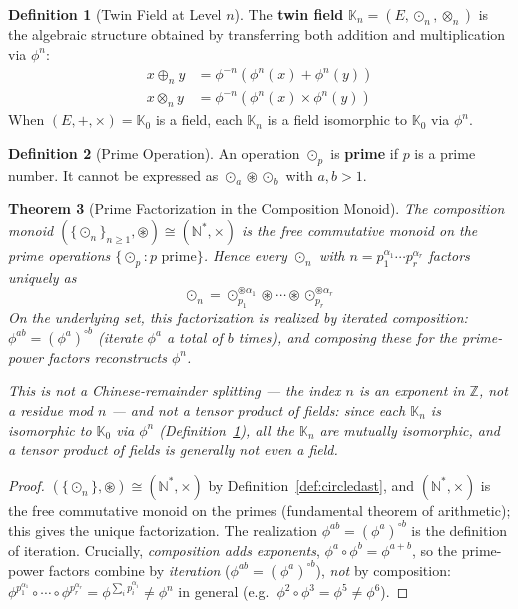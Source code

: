 \documentclass[11pt,twocolumn]{article}
\theoremstyle{plain}
\newtheorem{theorem}{Theorem}
\theoremstyle{definition}
\newtheorem{definition}[theorem]{Definition}
\theoremstyle{remark}
\newcommand{\N}{\mathbb{N}}
\newcommand{\Z}{\mathbb{Z}}
\newcommand{\Kk}{\mathbb{K}}
\begin{document}
\begin{definition}[Twin Field at Level $n$]\label{def:twin-field}
The \textbf{twin field} $\Kk_n = (E, \odot_n, \otimes_n)$ is the algebraic structure obtained by transferring both addition and multiplication via $\phi^n$:
\begin{align}
x \oplus_n y &= \phi^{-n}(\phi^n(x) + \phi^n(y)) \\
x \otimes_n y &= \phi^{-n}(\phi^n(x) \times \phi^n(y))
\end{align}
When $(E, +, \times) = \Kk_0$ is a field, each $\Kk_n$ is a field isomorphic to $\Kk_0$ via $\phi^n$.
\end{definition}

\begin{definition}[Prime Operation]\label{def:prime-op}
An operation $\odot_p$ is \textbf{prime} if $p$ is a prime number. It cannot be expressed as $\odot_a \circledast \odot_b$ with $a, b > 1$.
\end{definition}

\begin{theorem}[Prime Factorization in the Composition Monoid]\label{thm:prime-decomp}
The composition monoid $(\{\odot_n\}_{n\geq1}, \circledast) \cong (\N^*, \times)$ is the free commutative monoid on the prime operations $\{\odot_p : p \text{ prime}\}$. Hence every $\odot_n$ with $n = p_1^{\alpha_1} \cdots p_r^{\alpha_r}$ factors uniquely as
\begin{equation}
\boxed{\odot_n = \odot_{p_1}^{\circledast \alpha_1} \circledast \cdots \circledast \odot_{p_r}^{\circledast \alpha_r}}
\end{equation}
On the underlying set, this factorization is realized by \emph{iterated composition}: $\phi^{ab} = (\phi^a)^{\circ b}$ (iterate $\phi^a$ a total of $b$ times), and composing these for the prime-power factors reconstructs $\phi^n$.

This is \emph{not} a Chinese-remainder splitting --- the index $n$ is an exponent in $\Z$, not a residue mod $n$ --- and \emph{not} a tensor product of fields: since each $\Kk_n$ is isomorphic to $\Kk_0$ via $\phi^n$ (Definition~\ref{def:twin-field}), all the $\Kk_n$ are mutually isomorphic, and a tensor product of fields is generally not even a field.
\end{theorem}

\begin{proof}
$(\{\odot_n\}, \circledast) \cong (\N^*, \times)$ by Definition~\ref{def:circledast}, and $(\N^*, \times)$ is the free commutative monoid on the primes (fundamental theorem of arithmetic); this gives the unique factorization. The realization $\phi^{ab} = (\phi^a)^{\circ b}$ is the definition of iteration. Crucially, \emph{composition adds exponents}, $\phi^a \circ \phi^b = \phi^{a+b}$, so the prime-power factors combine by \emph{iteration} ($\phi^{ab} = (\phi^a)^{\circ b}$), \emph{not} by composition: $\phi^{p_1^{\alpha_1}} \circ \cdots \circ \phi^{p_r^{\alpha_r}} = \phi^{\sum_i p_i^{\alpha_i}} \neq \phi^{n}$ in general (e.g.\ $\phi^2 \circ \phi^3 = \phi^5 \neq \phi^6$).
\end{proof}
\end{document}

